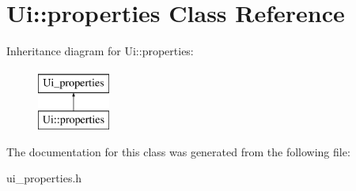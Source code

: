 \hypertarget{classUi_1_1properties}{
\section{Ui::properties Class Reference}
\label{classUi_1_1properties}
}
Inheritance diagram for Ui::properties:\begin{figure}[H]
\begin{center}
\leavevmode
\includegraphics[height=2.000000cm]{classUi_1_1properties}
\end{center}
\end{figure}


The documentation for this class was generated from the following file:\begin{DoxyCompactItemize}
\item 
ui\_\-properties.h\end{DoxyCompactItemize}
